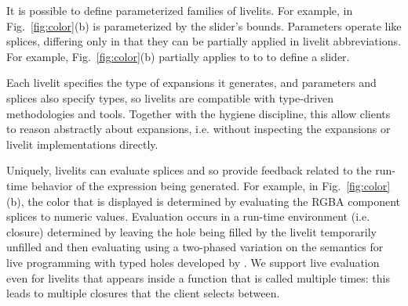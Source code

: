 It is possible to define parameterized families of livelits.
  For example,  in Fig.~\ref{fig:color}(b) is parameterized by the slider's bounds.
  Parameters operate like splices, differing only in that they can be partially applied in
  livelit abbreviations. For example, Fig.~\ref{fig:color}(b) 
  partially applies  to  to  to define a  slider.

 Each livelit specifies the type of expansions it generates, 
and parameters and splices also specify types, 
so livelits are compatible with type-driven methodologies and tools.
Together with the hygiene discipline, this allow clients to reason abstractly about expansions, i.e.  
without inspecting the expansions or livelit implementations directly.

 Uniquely, livelits can evaluate splices
  and so provide feedback related to the run-time behavior of the expression being generated.
  For example, in Fig.~\ref{fig:color}(b), 
  the color that is displayed is determined by evaluating the RGBA
  component splices to numeric values.
  Evaluation occurs in a run-time environment (i.e. closure) determined by
  leaving the hole being filled by the livelit temporarily unfilled and then evaluating
  using a two-phased variation on the semantics for 
  live programming with typed holes developed by \citet{HazelnutLive}.
  We support live evaluation even for livelits 
  that appears inside a function that is called multiple times: this leads 
  to multiple closures that the client 
   selects between.

